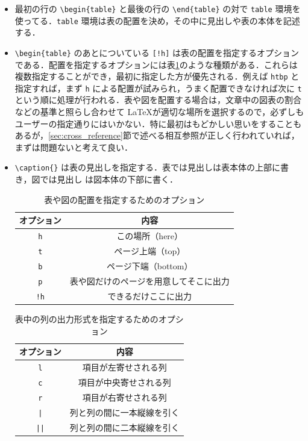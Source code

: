 \begin{itemize}
    \item 最初の行の \verb|\begin{table}| と最後の行の \verb|\end{table}| の対で \verb|table| 環境を使ってる．\verb|table| 環境は表の配置を決め，その中に見出しや表の本体を記述する．

    \item \verb|\begin{table}| のあとについている \verb|[!h]| は表の配置を指定するオプションである．配置を指定するオプションには表\ref{table:position}のような種類がある．これらは複数指定することができ，最初に指定した方が優先される．例えば \verb|htbp| と指定すれば，まず \verb|h| による配置が試みられ，うまく配置できなければ次に \verb|t| という順に処理が行われる．表や図を配置する場合は，文章中の図表の割合などの基準と照らし合わせて \LaTeX が適切な場所を選択するので，必ずしもユーザーの指定通りにはいかない．特に最初はもどかしい思いをすることもあるが，\ref{sec:cross_reference}節で述べる相互参照が正しく行われていれば，まずは問題ないと考えて良い．
    \item \verb|\caption{}| は表の見出しを指定する．表では見出しは表本体の上部に書き，図では見出し
    は図本体の下部に書く．

    \begin{table}[t]

        \caption{表や図の配置を指定するためのオプション}
        \label{table:position}
        \centering
        \begin{tabular}{c|c}
            オプション & 内容　\\ \hline
            \verb|h| & この場所（here） \\
            \verb|t| & ページ上端（top） \\
            \verb|b| & ページ下端（bottom） \\
            \verb|p| & 表や図だけのページを用意してそこに出力 \\
            \verb|!h| & できるだけここに出力\\
        \end{tabular}
    \end{table}

    \begin{table}[t]

        \caption{表中の列の出力形式を指定するためのオプション}
        \label{table:table_column}
        \centering
        \begin{tabular}{c|c}
            オプション & 内容　\\ \hline
            \verb|l| & 項目が左寄せされる列 \\
            \verb|c| & 項目が中央寄せされる列 \\
            \verb|r| & 項目が右寄せされる列 \\
            \verb+|+ & 列と列の間に一本縦線を引く \\
            \verb+||+ & 列と列の間に二本縦線を引く \\
        \end{tabular}
    \end{table}




\end{itemize}
